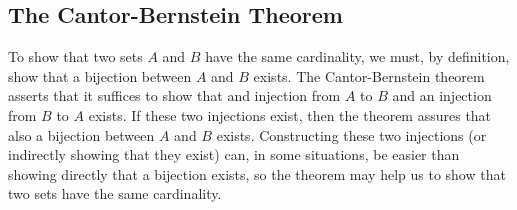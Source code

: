 







\subsection{The Cantor-Bernstein Theorem}
To show that two sets $A$ and $B$ have the same cardinality, we must, by definition, show that a bijection between $A$ and $B$ exists. The Cantor-Bernstein theorem asserts that it suffices to show that and injection from $A$ to $B$ and an injection from $B$ to $A$ exists. If these two injections exist, then the theorem assures that also a bijection between $A$ and $B$ exists. Constructing these two injections (or indirectly showing that they exist) can, in some situations, be easier than showing directly that a bijection exists, so the theorem may help us to show that two sets have the same cardinality.

